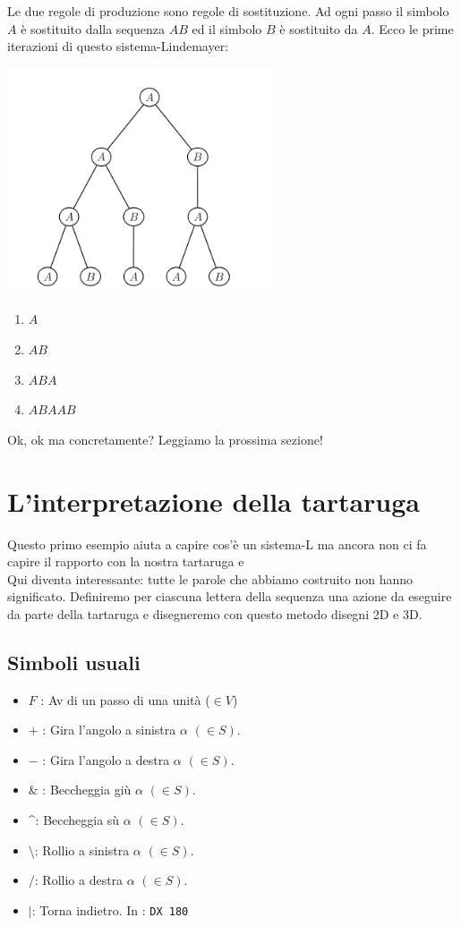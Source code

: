 Le due regole di produzione sono regole di sostituzione. Ad ogni passo il simbolo $A$ è sostituito dalla sequenza $AB$ ed il simbolo $B$ è sostituito da $A$. Ecco le prime iterazioni di questo sistema-Lindemayer:
\begin{center}
	\includegraphics[width=8cm]{pics/linden-arbre.png}
\end{center}
\begin{enumerate}
	\item $A$
	\item $AB$
	\item $ABA$
	\item $ABAAB$
\end{enumerate}
\vspace*{0.2cm}

Ok, ok ma concretamente? Leggiamo la prossima sezione!



\section{L'interpretazione della tartaruga}
Questo primo esempio aiuta a capire cos'è un sistema-L ma ancora non ci fa capire il rapporto con la nostra tartaruga e \logo\textellipsis\\
Qui diventa interessante: tutte le parole che abbiamo costruito non hanno significato. Definiremo per ciascuna lettera della sequenza una azione da eseguire da parte della tartaruga e disegneremo con questo metodo disegni 2D e 3D.


\subsection{Simboli usuali}
\begin{itemize}
 \item $F$ : Av di un passo di una unità ($\in V$)
 \item $+$ : Gira l'angolo a sinistra $\alpha$ $(\in S)$.
 \item $-$ : Gira l'angolo a destra $\alpha$ $(\in S)$.
 \item $\&$ : Beccheggia giù $\alpha$ $(\in S)$.
 \item \textasciicircum : Beccheggia sù $\alpha$ $(\in S)$.
 \item \textbackslash: Rollio a sinistra $\alpha$ $(\in S)$.
 \item $/$: Rollio a destra $\alpha$ $(\in S)$.
 \item $|$: Torna indietro. In \xlogo: \texttt{DX 180}
\end{itemize}
\vspace*{0.2cm}

